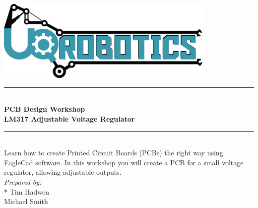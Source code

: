 \begin{titlepage}
\renewcommand{\hrule}{\rule{\linewidth}{0.5mm}}

\centering
\includegraphics[width=400px]{Robotics-Logo-Light.png}
\\[1.5cm]
\hrule
\\[0.5cm]
{\huge \bfseries PCB Design Workshop}\\
{\large \bfseries LM317 Adjustable Voltage Regulator}
\\[0.4cm]
\hrule
\\[0.5cm]
Learn how to create Printed Circuit Boards (PCBs) the right way using EagleCad software. In this workshop you will create a PCB for a small voltage regulator, allowing adjustable outputs.
\\[5cm]
\Large \emph{Prepared by:}
\\*
Tim Hadwen
\\
Michael Smith
\newpage
\end{titlepage}